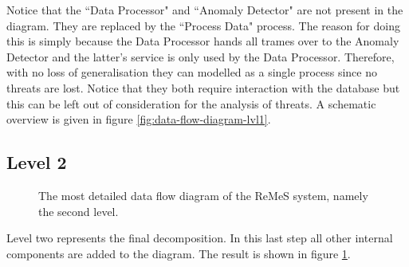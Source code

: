 \npar Notice that the ``Data Processor" and ``Anomaly Detector" are not present
in the diagram. They are replaced by the ``Process Data" process. The reason for
doing this is simply because the Data Processor hands all trames over to the
Anomaly Detector and the latter's service is only used by the Data Processor.
Therefore, with no loss of generalisation they can modelled as a single process
since no threats are lost. Notice that they both require interaction with the
database but this can be left out of consideration for the analysis of threats. 
A schematic overview is given in figure \ref{fig:data-flow-diagram-lvl1}.

\subsection{Level 2}

\begin{figure}[H]
	\begin{centering}
		\caption{The most detailed data flow diagram of the ReMeS system, namely the
		second level.}
		\label{fig:data-flow-diagram-lvl2}
	\end{centering}
\end{figure}

\npar Level two represents the final decomposition. In this last step all
other internal components are added to the diagram. The result is shown in
figure \ref{fig:data-flow-diagram-lvl2}.
